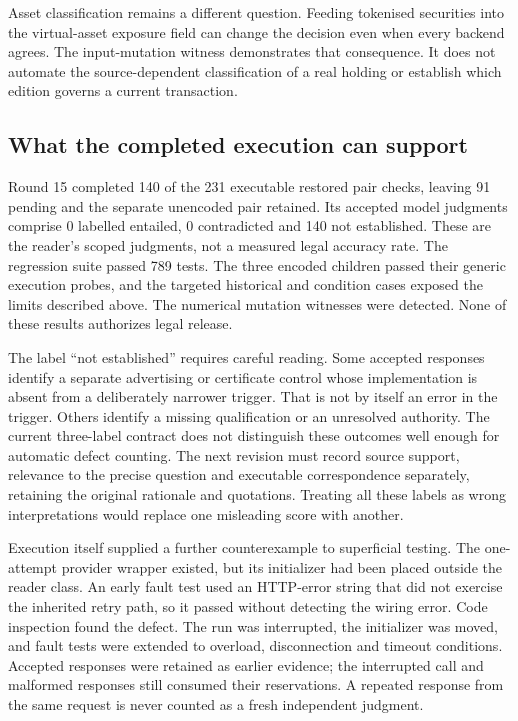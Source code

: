 \documentclass[12pt,a4paper,oneside,openany]{book}
\begin{document}
Asset classification remains a different question. Feeding tokenised securities
into the virtual-asset exposure field can change the decision even when every
backend agrees. The input-mutation witness demonstrates that consequence. It
does not automate the source-dependent classification of a real holding or
establish which edition governs a current transaction.

\subsection{What the completed execution can support}

Round 15 completed 140 of the 231 executable restored pair checks, leaving 91 pending and the separate unencoded pair retained. Its accepted model judgments comprise 0 labelled entailed, 0 contradicted and 140 not established. These are the reader's scoped judgments, not a measured legal accuracy rate. The regression suite passed 789 tests. The three encoded children passed their generic execution probes, and the targeted historical and condition cases exposed the limits described above. The numerical mutation witnesses were detected. None of these results authorizes legal release.

The label ``not established'' requires careful reading. Some accepted responses
identify a separate advertising or certificate control whose implementation is
absent from a deliberately narrower trigger. That is not by itself an error in
the trigger. Others identify a missing qualification or an unresolved authority.
The current three-label contract does not distinguish these outcomes well enough
for automatic defect counting. The next revision must record source support,
relevance to the precise question and executable correspondence separately,
retaining the original rationale and quotations. Treating all these labels as
wrong interpretations would replace one misleading score with another.

Execution itself supplied a further counterexample to superficial testing. The
one-attempt provider wrapper existed, but its initializer had been placed outside
the reader class. An early fault test used an HTTP-error string that did not
exercise the inherited retry path, so it passed without detecting the wiring
error. Code inspection found the defect. The run was interrupted, the initializer
was moved, and fault tests were extended to overload, disconnection and timeout
conditions. Accepted responses were retained as earlier evidence; the interrupted
call and malformed responses still consumed their reservations. A repeated
response from the same request is never counted as a fresh independent judgment.
\end{document}
